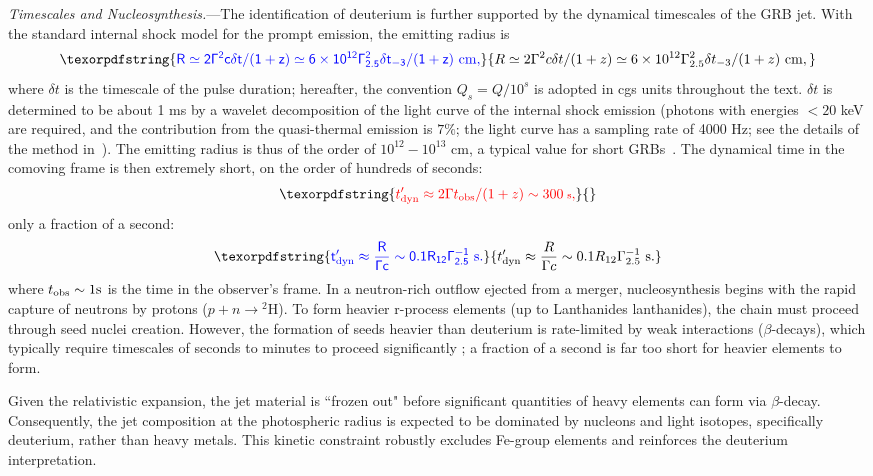 \documentclass[linenumbers,twocolumn]{aastex631}
\providecommand{\DIFaddtex}[1]{{\protect\color{blue} \sf #1}} %
\providecommand{\DIFdeltex}[1]{{\protect\color{red} \scriptsize #1}} %
\providecommand{\DIFaddbegin}{} %
\providecommand{\DIFaddend}{} %
\providecommand{\DIFdelbegin}{} %
\providecommand{\DIFdelend}{} %
\providecommand{\DIFadd}[1]{\texorpdfstring{\DIFaddtex{#1}}{#1}} %
\providecommand{\DIFdel}[1]{\texorpdfstring{\DIFdeltex{#1}}{}} %
\begin{document}
\textit{Timescales and Nucleosynthesis.}---The identification of deuterium is further supported by the dynamical timescales of the GRB jet. %
\DIFaddbegin \DIFadd{With the standard internal shock model for the prompt emission, the emitting radius is~\citep{2011ApJ...726...90Z}
}\begin{equation}\DIFadd{\label{eq:Ris}
R \simeq 2 \Gamma^2 c \delta t/(1+z) \simeq 6 \times 10^{12} \Gamma_{2.5}^2 \delta t_{-3}/(1+z) \ {\rm cm},
}\end{equation}
\DIFadd{where $\delta t$ is the timescale of the pulse duration; hereafter, the convention $Q_s = Q/10^s$ is adopted in cgs units throughout the text. $\delta t$ is determined to be about 1 ms by a wavelet decomposition of the light curve of the internal shock emission (photons with energies $< 20$ keV are required, and the contribution from the quasi-thermal emission is $7\%$; the light curve has a sampling rate of 4000 Hz; see the details of the method in~\citealt{2013MNRAS.432..857M}). The emitting radius is thus of the order of $10^{12}-10^{13}$ cm, a typical value for short GRBs~\citep{2014ARA&A..52...43B}. }\DIFaddend The dynamical time in the comoving frame is \DIFaddbegin \DIFadd{then }\DIFaddend extremely short, \DIFdelbegin \DIFdel{on the order of hundreds of seconds:
}\begin{displaymath}
\DIFdel{t'_{\rm dyn} \approx 2\Gamma t_{\rm obs}/(1+z) \sim 300 \text{ s},
}\end{displaymath}%
\DIFdelend \DIFaddbegin \DIFadd{only a fraction of a second:
}\begin{equation}
\DIFadd{t'_{\rm dyn} \approx \frac{R}{\Gamma c} \sim 0.1 R_{12} \Gamma_{2.5}^{-1} \text{ s}.
}\end{equation}\DIFaddend 
\DIFdelbegin \DIFdel{where $t_{\rm obs} \sim 1 \text{s}$ is the time in the observer's frame.
}\DIFdelend In a neutron-rich outflow ejected from a merger, nucleosynthesis begins with the rapid capture of neutrons by protons ($p + n \rightarrow {^2\text{H}}$). To form heavier r-process elements (up to \DIFdelbegin \DIFdel{Lanthanides}\DIFdelend \DIFaddbegin \DIFadd{lanthanides}\DIFaddend ), the chain must proceed through seed nuclei creation. However, the formation of seeds heavier than deuterium is rate-limited by weak interactions ($\beta$-decays), which typically require timescales of seconds to minutes to proceed significantly\DIFaddbegin \DIFadd{; a fraction of a second is far too short for heavier elements to form}\DIFaddend .

Given the relativistic expansion, the jet material is ``frozen out" before significant quantities of heavy elements can form via $\beta$-decay. Consequently, the jet composition at the photospheric radius is expected to be dominated by nucleons and light isotopes, specifically deuterium, rather than heavy metals. This kinetic constraint robustly excludes Fe-group elements and reinforces the deuterium interpretation.
\end{document}
